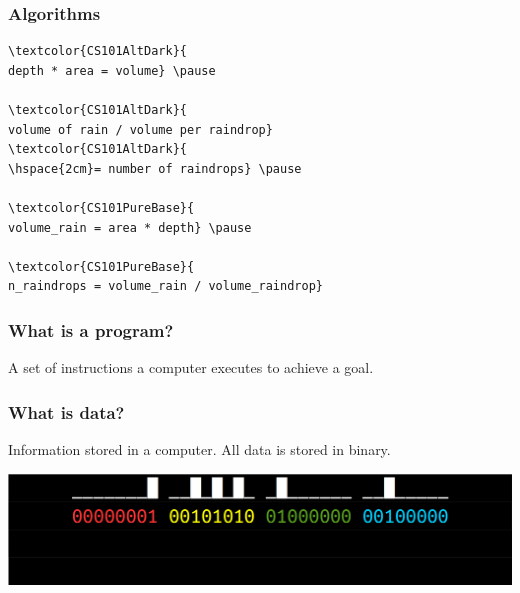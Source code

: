 \documentclass[11pt]{beamer}
\begin{document}
\begin{frame}[fragile]
  \frametitle{Algorithms}
  \Enlarge
  \begin{Verbatim}[commandchars=\\\{\}]
\textcolor{CS101AltDark}{
depth * area = volume} \pause

\textcolor{CS101AltDark}{
volume of rain / volume per raindrop}
\textcolor{CS101AltDark}{
\hspace{2cm}= number of raindrops} \pause

\textcolor{CS101PureBase}{
volume_rain = area * depth} \pause

\textcolor{CS101PureBase}{
n_raindrops = volume_rain / volume_raindrop}
  \end{Verbatim}
\end{frame}

\begin{frame}
  \frametitle{What is a program?}
  \Enlarge

  \begin{itemize} \pause
    \myitem A set of instructions a computer executes to achieve a goal.
  \end{itemize}
\end{frame}

\begin{frame}
  \frametitle{What is data?}
  \Enlarge

  \begin{itemize} \pause
    \myitem Information stored in a computer. \pause
    \myitem All data is stored in binary.
  \end{itemize}
  \includegraphics[width=\textwidth]{./img/assembler-2.png}
\end{frame}
\end{document}
